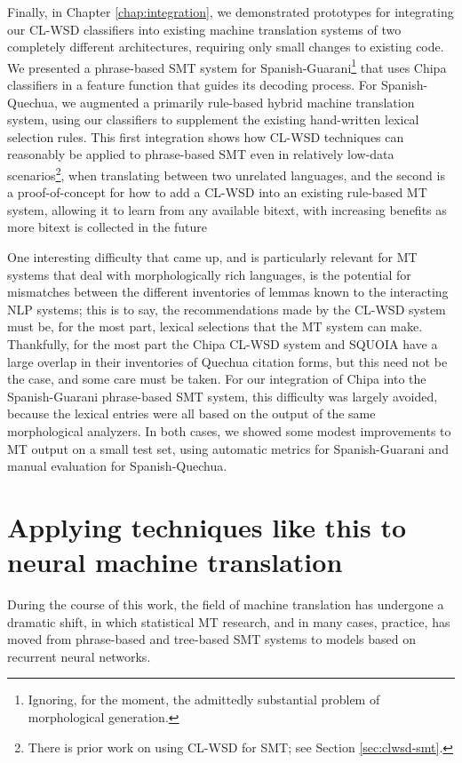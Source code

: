 Finally, in Chapter \ref{chap:integration}, we demonstrated prototypes for
integrating our CL-WSD classifiers into existing machine translation systems of
two completely different architectures, requiring only small changes to
existing code.  We presented a phrase-based SMT system for
Spanish-Guarani\footnote{Ignoring, for the moment, the admittedly substantial
problem of morphological generation.} that uses Chipa classifiers in a feature
function that guides its decoding process. For Spanish-Quechua, we augmented a
primarily rule-based hybrid machine translation system, using our classifiers
to supplement the existing hand-written lexical selection rules. This first
integration shows how CL-WSD techniques can reasonably be applied to
phrase-based SMT even in relatively low-data scenarios\footnote{There is prior
work on using CL-WSD for SMT; see Section \ref{sec:clwsd-smt}.}, when
translating between two unrelated languages, and the second is a
proof-of-concept for how to add a CL-WSD into an existing rule-based MT system,
allowing it to learn from any available bitext, with increasing benefits as
more bitext is collected in the future

One interesting difficulty that came up, and is particularly relevant for MT
systems that deal with morphologically rich languages, is the potential for
mismatches between the different inventories of lemmas known to the interacting
NLP systems; this is to say, the recommendations made by the CL-WSD system must
be, for the most part, lexical selections that the MT system can make.
Thankfully, for the most part the Chipa CL-WSD system and SQUOIA have a large
overlap in their inventories of Quechua citation forms, but this need not be
the case, and some care must be taken. For our integration of Chipa into the
Spanish-Guarani phrase-based SMT system, this difficulty was largely avoided,
because the lexical entries were all based on the output of the same
morphological analyzers. In both cases, we showed some modest improvements to
MT output on a small test set, using automatic metrics for Spanish-Guarani and
manual evaluation for Spanish-Quechua.

\section{Applying techniques like this to neural machine translation}
During the course of this work, the field of machine translation has undergone
a dramatic shift, in which statistical MT research, and in many cases,
practice\cite{gnmt}, has moved from phrase-based and tree-based SMT systems to
models based on recurrent neural networks.

